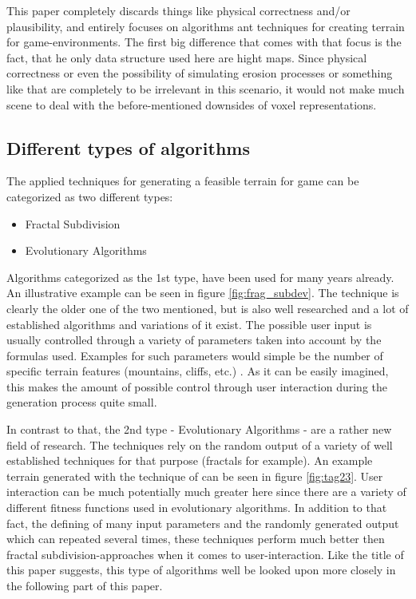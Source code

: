 This paper completely discards things like physical correctness and/or plausibility, and entirely focuses on algorithms ant techniques for creating terrain for game-environments. The first big difference that comes with that focus is the fact, that he only data structure used here are hight maps. Since physical correctness or even the possibility of simulating erosion processes or something like that are completely to be irrelevant in this scenario, it would not make much scene to deal with the before-mentioned downsides of voxel representations.

\subsection{Different types of algorithms}
The applied techniques for generating a feasible terrain for game can be categorized as two different types:
\begin{itemize}
	\item Fractal Subdivision 
	\item Evolutionary Algorithms
\end{itemize}

Algorithms categorized as the 1st type, have been used for many years already. An illustrative example can be seen in figure \ref{fig:frag_subdev}. The technique is clearly the older one of the two mentioned, but is also well researched and a lot of established algorithms and variations of it exist. The possible user input is usually controlled through a variety of parameters taken into account by the formulas used. Examples for such parameters would simple be the number of specific terrain features (mountains, cliffs, etc.) \cite{raffe2012survey}. As it can be easily imagined, this makes the amount of possible control through user interaction during the generation process quite small.

In contrast to that, the 2nd type - Evolutionary Algorithms - are a rather new field of research. The techniques rely on the random output of a variety of well established techniques for that purpose (fractals for example). An example terrain generated with the technique of \cite{togelius2010towards} can be seen in figure \ref{fig:tag23}. User interaction can be much potentially much greater here since there are a variety of different fitness functions used in evolutionary algorithms. In addition to that fact, the defining of many input parameters and the randomly generated output which can repeated several times, these techniques perform much better then fractal subdivision-approaches when it comes to user-interaction. Like the title of this paper suggests, this type of algorithms well be looked upon more closely in the following part of this paper.

